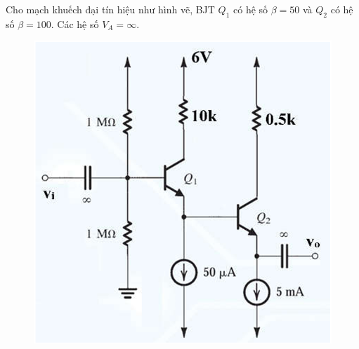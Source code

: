 
Cho mạch khuếch đại tín hiệu như hình vẽ, BJT $Q_{1}$ có hệ số $\beta = 50$ và $Q_{2}$ có hệ số $\beta = 100$. Các hệ số $V_{A} = \infty$.

\begin{figure}[H]
	\centering
	\includegraphics[width=\linewidth]{./my-chapters/my-images/Question7/debai.png}
\end{figure}


